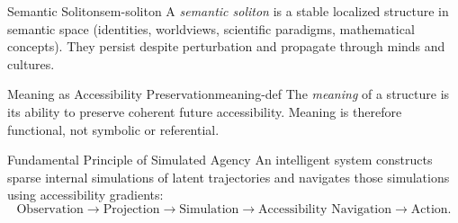\begin{definition}{Semantic Soliton}{sem-soliton}
  A \emph{semantic soliton} is a stable localized structure in semantic
  space (identities, worldviews, scientific paradigms, mathematical concepts).
  They persist despite perturbation and propagate through minds and cultures.
\end{definition}

\begin{definition}{Meaning as Accessibility Preservation}{meaning-def}
  The \emph{meaning} of a structure is its ability to preserve coherent
  future accessibility. Meaning is therefore functional, not symbolic or
  referential.
\end{definition}

\begin{namedthm}{Fundamental Principle of Simulated Agency}
  An intelligent system constructs sparse internal simulations of latent
  trajectories and navigates those simulations using accessibility gradients:
  \[
    \text{Observation} \to \text{Projection} \to \text{Simulation}
    \to \text{Accessibility Navigation} \to \text{Action.}
  \]
\end{namedthm}
